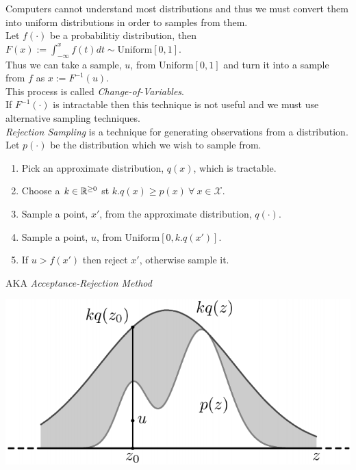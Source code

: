\documentclass[11pt,a4paper]{article}
\begin{document}
Computers cannot understand most distributions and thus we must convert them into uniform distributions in order to samples from them.\\
Let $f(\cdot)$ be a probabilitiy distribution, then $F(x):=\displaystyle\int_{-\infty}^xf(t)dt\sim\text{Uniform}[0,1]$.\\
Thus we can take a sample, $u$, from $\text{Uniform}[0,1]$ and turn it into a sample from $f$ as $x:=F^{-1}(u)$.\\
\nb This process is called \textit{Change-of-Variables}.\\
\nb If $F^{-1}(\cdot)$ is intractable then this technique is not useful and we must use alternative sampling techniques.\\

\textit{Rejection Sampling} is a technique for generating observations from a distribution.\\
Let $p(\cdot)$ be the distribution which we wish to sample from.
\begin{enumerate}
	\item Pick an approximate distribution, $q(x)$, which is tractable.
	\item Choose a $k\in\mathbb{R}^{\geq0}$ st $k.q(x)\geq p(x)\ \forall\ x\in\mathcal{X}$.
	\item Sample a point, $x'$, from the approximate distribution, $q(\cdot)$.
	\item Sample a point, $u$, from $\text{Uniform}[0,k.q(x')]$.
	\item If $u>f(x')$ then reject $x'$, otherwise sample it.
\end{enumerate}
\nb AKA \textit{Acceptance-Rejection Method}
\begin{center}
\includegraphics[scale=.5]{img/rejectionSampling.png}
\end{center}
\end{document}
